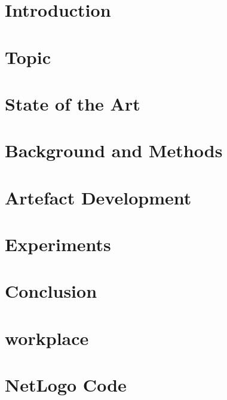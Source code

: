 \documentclass[12pt]{report}
\begin{document}

\pagestyle{fancy}
\rfoot{\thepage}
\cfoot{}






\newpage
\tableofcontents
\listoffigures
\listoftables
\clearpage


\pagestyle{plain}

\chapter{Introduction}
\label{sec:intro}


\chapter{Topic}
\label{sec:Slimemold}


\chapter{State of the Art}
\label{sec:relatedwork}


\chapter{Background and Methods}
\label{sec:methods}


\chapter{Artefact Development}
\label{sec:implementation}


\chapter{Experiments}
\label{sec:experiments}


\chapter{Conclusion}
\label{sec:conclusion}


\chapter{workplace}
\label{sec:workplace}


\newpage




\newpage

\appendix
{}
\chapter{NetLogo Code}
\label{sec:appendix-netlogo}


\end{document}
